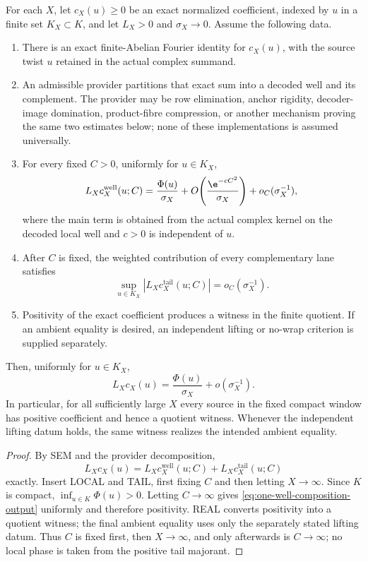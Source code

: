 \begin{theorem}
\label{thm:one-well-composition}
For each $X$, let $c_X(u)\geq0$ be an exact normalized coefficient, indexed by $u$ in a finite set $K_X\subset K$, and let $L_X>0$ and $\sigma_X\to0$.  Assume the following data.
\begin{enumerate}[label=\textup{(\roman*)}]
\item[\textup{(SEM)}] There is an exact finite-Abelian Fourier identity for $c_X(u)$, with the source twist $u$ retained in the actual complex summand.
\item[\textup{(OBS/COMP)}] An admissible provider partitions that exact sum into a decoded well and its complement.  The provider may be row elimination, anchor rigidity, decoder-image domination, product-fibre compression, or another mechanism proving the same two estimates below; none of these implementations is assumed universally.
\item[\textup{(LOCAL)}] For every fixed $C>0$, uniformly for $u\in K_X$,
\[
 L_X c_X^{\mathrm{well}}(u;C)
 =\frac{\Phi(u)}{\sigma_X}
  +O\!\left(\frac{\e^{-cC^2}}{\sigma_X}\right)
  +o_C(\sigma_X^{-1}),
\]
where the main term is obtained from the actual complex kernel on the decoded local well and $c>0$ is independent of $u$.
\item[\textup{(TAIL)}] After $C$ is fixed, the weighted contribution of every complementary lane satisfies
\[
 \sup_{u\in K_X}
 \left|L_X c_X^{\mathrm{tail}}(u;C)\right|
 =o_C(\sigma_X^{-1}).
\]
\item[\textup{(REAL)}] Positivity of the exact coefficient produces a witness in the finite quotient.  If an ambient equality is desired, an independent lifting or no-wrap criterion is supplied separately.
\end{enumerate}
Then, uniformly for $u\in K_X$,
\begin{equation}
\label{eq:one-well-composition-output}
 L_Xc_X(u)=\frac{\Phi(u)}{\sigma_X}+o(\sigma_X^{-1}).
\end{equation}
In particular, for all sufficiently large $X$ every source in the fixed compact window has positive coefficient and hence a quotient witness.  Whenever the independent lifting datum holds, the same witness realizes the intended ambient equality.
\end{theorem}

\begin{proof}
By SEM and the provider decomposition,
\[
 L_Xc_X(u)=L_Xc_X^{\mathrm{well}}(u;C)
             +L_Xc_X^{\mathrm{tail}}(u;C)
\]
exactly.  Insert LOCAL and TAIL, first fixing $C$ and then letting $X\to\infty$.  Since $K$ is compact, $\inf_{u\in K}\Phi(u)>0$.  Letting $C\to\infty$ gives \cref{eq:one-well-composition-output} uniformly and therefore positivity.  REAL converts positivity into a quotient witness; the final ambient equality uses only the separately stated lifting datum.  Thus $C$ is fixed first, then $X\to\infty$, and only afterwards is $C\to\infty$; no local phase is taken from the positive tail majorant.
\end{proof}

